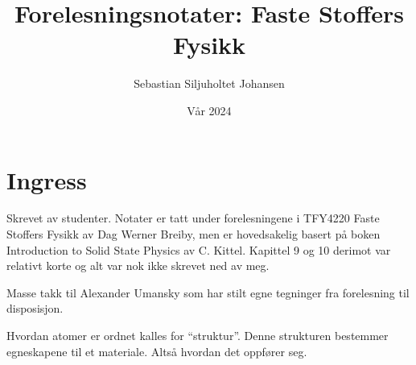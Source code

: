 \documentclass{article}
\title{Forelesningsnotater: Faste Stoffers Fysikk}
\author{Sebastian Siljuholtet Johansen }
\date{Vår 2024}
\begin{document}
\maketitle

\nyside
\section*{Ingress}
Skrevet av studenter. Notater er tatt under forelesningene i TFY4220 Faste Stoffers Fysikk av Dag Werner Breiby, men er hovedsakelig basert på boken Introduction to Solid State Physics av C. Kittel. Kapittel 9 og 10 derimot var relativt korte og alt var nok ikke skrevet ned av meg.

Masse takk til Alexander Umansky som har stilt egne tegninger fra forelesning til disposisjon.
\nyside
\tableofcontents

\nyside
{}
Hvordan atomer er ordnet kalles for \enquote{struktur}. Denne strukturen bestemmer egneskapene til et materiale. Altså hvordan det oppfører seg.
\end{document}
